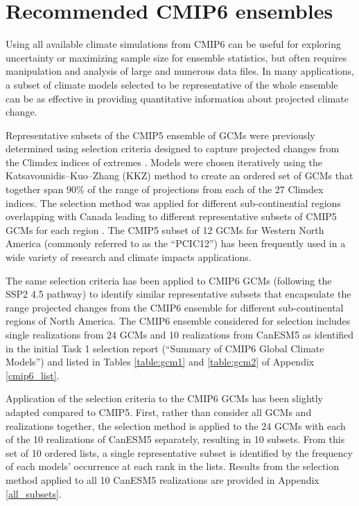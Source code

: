 \documentclass[]{scrartcl}
\begin{document}

\clearpage

\section{Recommended CMIP6 ensembles}\label{selection}

Using all available climate simulations from CMIP6 can be useful for exploring uncertainty or maximizing sample size for ensemble statistics, but often requires manipulation and analysis of large and numerous data files. In many applications, a subset of climate models selected to be representative of the whole ensemble can be as effective in providing quantitative information about projected climate change. 

Representative subsets of the CMIP5 ensemble of GCMs were previously determined using selection criteria \citep{cannon_selecting_2014} designed to capture projected changes from the Climdex indices of extremes \citep{Zhang2011}. Models were chosen iteratively using the Katsavounidis–Kuo–Zhang (KKZ) method to create an ordered set of GCMs that together span $90\%$ of the range of projections from each of the 27 Climdex indices. The selection method was applied for different sub-continential regions \citep{Giorgi2000} overlapping with Canada leading to different representative subsets of CMIP5 GCMs for each region \citep{cannon_selecting_2014}. The CMIP5 subset of 12 GCMs for Western North America (commonly referred to as the ``PCIC12'') has been frequently used in a wide variety of research and climate impacts applications. 

The same selection criteria has been applied to CMIP6 GCMs (following the SSP2 4.5 pathway) to identify similar representative subsets that encapsulate the range projected changes from the CMIP6 ensemble for different sub-continental regions of North America. The CMIP6 ensemble considered for selection includes single realizations from 24 GCMs and 10 realizations from CanESM5 as identified in the initial Task 1 selection report (``Summary of CMIP6 Global Climate Models'') and listed in Tables \ref{table:gcm1} and \ref{table:gcm2} of Appendix \ref{cmip6_list}. 

Application of the selection criteria to the CMIP6 GCMs has been slightly adapted compared to CMIP5. First, rather than consider all GCMs and realizations together, the selection method is applied to the 24 GCMs with each of the 10 realizations of CanESM5 separately, resulting in 10 subsets. From this set of 10 ordered lists, a single representative subset is identified by the frequency of each models' occurrence at each rank in the lists. Results from the selection method applied to all 10 CanESM5 realizations are provided in Appendix \ref{all_subsets}.
\end{document}
